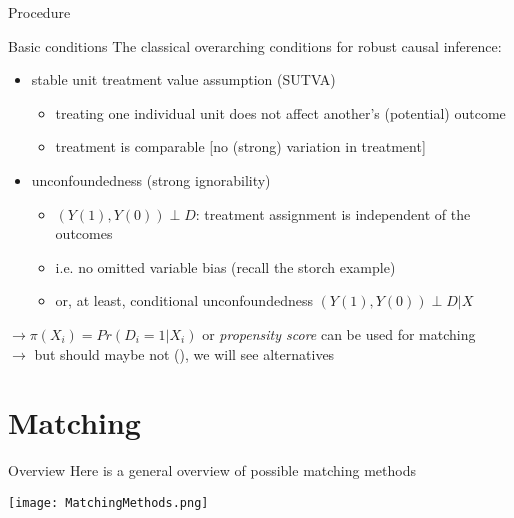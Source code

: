 \documentclass[aspectratio=169]{beamer}
\begin{document}
		\begin{frame}{Procedure}
			\begin{center}
			\end{center}
		\end{frame}

		\begin{frame}{Basic conditions}
			The classical overarching conditions for robust causal inference:
			\\ \vspace*{.25cm}
			\begin{itemize}
				\item stable unit treatment value assumption (SUTVA)
				\begin{itemize}
					\item treating one individual unit does not affect another's (potential) outcome
					\item treatment is comparable [no (strong) variation in treatment]
				\end{itemize}
				\item<2-> unconfoundedness (strong ignorability)
				\begin{itemize}
					\item<2-> $(Y(1), Y(0)) \perp D$: treatment assignment is independent of the outcomes
					\item<2-> i.e. no omitted variable bias (recall the storch example)
					\item<2-> or, at least, conditional unconfoundedness  $(Y(1), Y(0)) \perp D {}|{} X$
				\end{itemize}
			\end{itemize}
			\vspace*{.25cm}  {$\rightarrow \pi(X_i) = Pr(D_i = 1 | X_i)$ or \textit{propensity score} can be used for matching}
			\\ \onslide<4> {$\rightarrow$ but should maybe not (\cite{King2019}), we will see alternatives }
		\end{frame}

\section{Matching}

		\begin{frame}{Overview}
			Here is a general overview of possible matching methods
			\\ \vspace*{.05cm}
			\begin{center}
				\texttt{[image: MatchingMethods.png]}
			\end{center}
		\end{frame}
\end{document}
